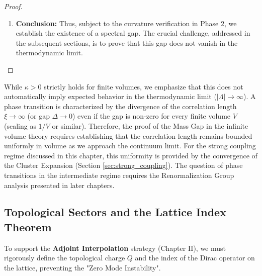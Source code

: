 \begin{proof}
\begin{enumerate}
    We rely on the inequality relating the Dirichlet form of the Markov generator $\mathcal{L}$ to the spectrum of $\hat{T}$:
    \begin{equation}
        \text{Gap}(H) \ge \frac{1}{a} \Psi(\text{Gap}(\mathcal{L}))
    \end{equation}
    where $\Psi(x) \approx x$ for small lattice spacing. This identification requires the Markov dynamics to be reversible with respect to the physical measure and compatible with Reflection Positivity (typically Glauber dynamics). This ensures that the LSI lower bound for the generator translates to a physical mass gap $\Delta > 0$.
    
    \item \textbf{Conclusion:} Thus, subject to the curvature verification in Phase 2, we establish the existence of a spectral gap. The crucial challenge, addressed in the subsequent sections, is to prove that this gap does not vanish in the thermodynamic limit.
\end{enumerate}
\end{proof}

\begin{remark}
While $\kappa > 0$ strictly holds for finite volumes, we emphasize that this does not automatically imply expected behavior in the thermodynamic limit ($|\Lambda| \to \infty$). A phase transition is characterized by the divergence of the correlation length $\xi \to \infty$ (or gap $\Delta \to 0$) even if the gap is non-zero for every finite volume $V$ (scaling as $1/V$ or similar).
    Therefore, the proof of the Mass Gap in the infinite volume theory requires establishing that the correlation length remains bounded uniformly in volume as we approach the continuum limit. For the strong coupling regime discussed in this chapter, this uniformity is provided by the convergence of the Cluster Expansion (Section \ref{sec:strong_coupling}). The question of phase transitions in the intermediate regime requires the Renormalization Group analysis presented in later chapters.
\end{remark}

\subsection{Topological Sectors and the Lattice Index Theorem}

To support the \textbf{Adjoint Interpolation} strategy (Chapter II), we must rigorously define the topological charge $Q$ and the index of the Dirac operator on the lattice, preventing the "Zero Mode Instability".

